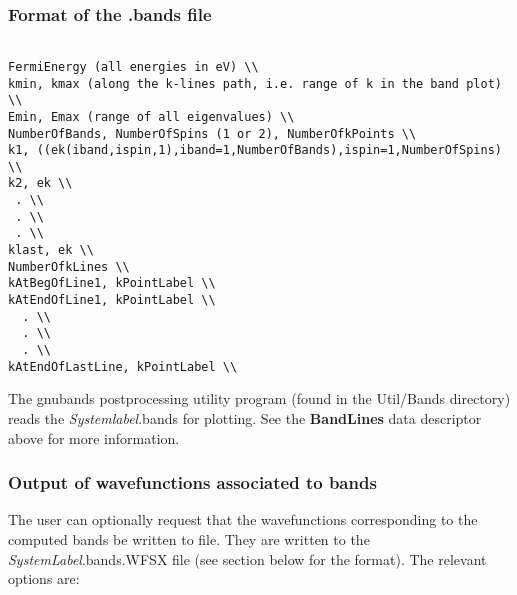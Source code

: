 \documentclass[11pt]{article}
\begin{document}
\subsubsection{Format of the .bands file}

\begin{verbatim}

FermiEnergy (all energies in eV) \\
kmin, kmax (along the k-lines path, i.e. range of k in the band plot) \\
Emin, Emax (range of all eigenvalues) \\
NumberOfBands, NumberOfSpins (1 or 2), NumberOfkPoints \\
k1, ((ek(iband,ispin,1),iband=1,NumberOfBands),ispin=1,NumberOfSpins) \\
k2, ek \\
 . \\
 . \\
 . \\
klast, ek \\
NumberOfkLines \\
kAtBegOfLine1, kPointLabel \\
kAtEndOfLine1, kPointLabel \\
  . \\
  . \\
  . \\
kAtEndOfLastLine, kPointLabel \\
\end{verbatim}

\noindent
The {\sc gnubands} postprocessing
utility program (found in the Util/Bands directory) reads the {\it
  Systemlabel}.bands for plotting.  See the {\bf BandLines} data
descriptor above for more information.

\subsubsection{Output of wavefunctions associated to bands}
\label{sec:wf-bands}

The user can optionally request that the wavefunctions corresponding
to the computed bands be written to file. 
They are written to the {\it SystemLabel}.bands.WFSX file
(see section below for the
format). The relevant options are:
\end{document}

